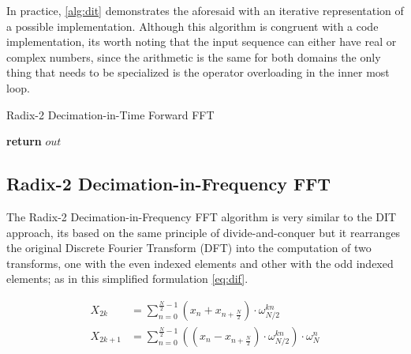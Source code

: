 \documentclass[
  oneside,
  11pt, a4paper,
  footinclude=true,
  headinclude=true,
  cleardoublepage=empty
]{scrbook}
\begin{document}
In practice, \autoref{alg:dit} demonstrates the aforesaid with an iterative representation of a possible implementation. Although this algorithm is congruent with a code implementation, its worth noting that the input sequence can either have real or complex numbers, since the arithmetic is the same for both domains the only thing that needs to be specialized is the operator overloading in the inner most loop.

\begin{algorithm}[H]
    \caption{Radix-2 Decimation-in-Time Forward FFT} \label{alg:dit}


    \textbf{return} $out$\;
\end{algorithm}

\subsection{Radix-2 Decimation-in-Frequency FFT} \label{subsec:radix-2-decimation-in-frequency-fft}

The Radix-2 Decimation-in-Frequency FFT algorithm is very similar to the DIT approach, its based on the same principle of divide-and-conquer but it rearranges the original Discrete Fourier Transform (DFT) into the computation of two transforms, one with the even indexed elements and other with the odd indexed elements; as in this simplified formulation \autoref{eq:dif}.

\begin{equation} \label{eq:dif}
    \begin{aligned}
        X_{2k} &= \sum_{n=0}^{\frac{N}{2}-1} (x_{n} + x_{n + \frac{N}{2}}) \cdot \omega_{N/2}^{kn} \\
        X_{2k+1} &= \sum_{n=0}^{\frac{N}{2}-1} ((x_{n} - x_{n + \frac{N}{2}}) \cdot \omega_{N/2}^{kn}) \cdot \omega_{N}^{n} \\
    \end{aligned}
\end{equation}
\end{document}
